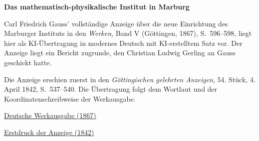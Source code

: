 \clearpage
\thispagestyle{empty}
\begin{center}\Large\textbf{Das mathematisch-physikalische Institut in Marburg}\end{center}

Carl Friedrich Gauss’ vollständige Anzeige über die neue Einrichtung des Marburger Instituts in den \textit{Werken}, Band V (Göttingen, 1867), S.~596--598, liegt hier als KI-Übertragung in modernes Deutsch mit KI-erstelltem Satz vor. Der Anzeige liegt ein Bericht zugrunde, den Christian Ludwig Gerling an Gauss geschickt hatte.

Die Anzeige erschien zuerst in den \textit{Göttingischen gelehrten Anzeigen}, 54. Stück, 4. April 1842, S.~537--540. Die Übertragung folgt dem Wortlaut und der Koordinatenschreibweise der Werkausgabe.

\medskip\noindent
\href{https://gdz.sub.uni-goettingen.de/id/PPN236006339}{Deutsche Werkausgabe (1867)}\par
\noindent\href{https://gdz.sub.uni-goettingen.de/id/PPN385030444_1842_1}{Erstdruck der Anzeige (1842)}
\clearpage
